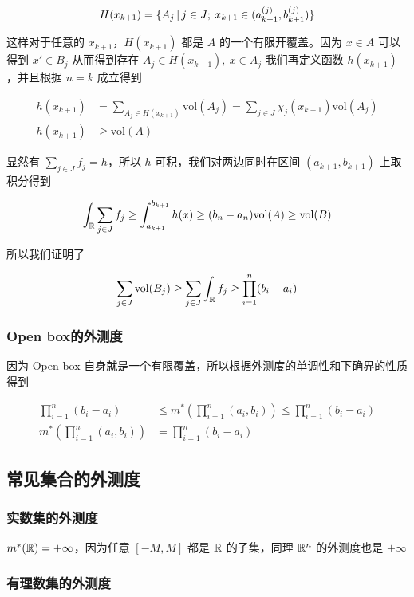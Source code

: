 \[
H(x_{k+1}) = \{ A_j \,\vert\, j \in J;\: x_{k+1} \in (a_{k+1}^{(j)}, b_{k+1}^{(j)}) \}
\]

这样对于任意的 $x_{k+1}$，$H(x_{k+1})$ 都是 $A$ 的一个有限开覆盖。因为 $x \in A$ 可以得到 $x' \in B_j$ 从而得到存在 $A_j \in H(x_{k+1}), \: x \in A_j$
我们再定义函数 $h(x_{k+1})$，并且根据 $n=k$ 成立得到

\begin{align*}
h(x_{k+1}) &= \sum_{A_j \in H(x_{k+1})} \mathrm{vol}(A_j) = \sum_{j \in J}\chi_{j}(x_{k+1}) \mathrm{vol}(A_j) \\
h(x_{k+1}) & \ge \mathrm{vol}(A) 
\end{align*}

 
显然有 $\sum_{j \in J}f_j = h$，所以 $h$ 可积，我们对两边同时在区间 $(a_{k+1}, b_{k+1})$ 上取积分得到


\[
 \int_{\mathbb{R}}\sum_{j \in J}f_j \ge \int_{a_{k+1}}^{b_{k+1}}h(x) \ge (b_n - a_n)\mathrm{vol}(A) \ge \mathrm{vol}(B)
\]


所以我们证明了

\[
    \sum_{j \in J}\mathrm{vol}(B_j) \ge \sum_{j \in J}\int_{\mathbb{R}}f_j \ge \prod_{i=1}^{n}(b_i - a_i)
\]

\subsubsection{Open box的外测度}

因为 Open box 自身就是一个有限覆盖，所以根据外测度的单调性和下确界的性质得到

\begin{align*}
 \prod_{i=1}^{n}(b_i - a_i) & \le m^*(\prod_{i=1}^{n}(a_i, b_i)) \le \prod_{i=1}^{n}(b_i - a_i) \\
m^*(\prod_{i=1}^{n}(a_i, b_i)) & = \prod_{i=1}^{n}(b_i - a_i)
\end{align*}

\subsection{常见集合的外测度}

\subsubsection{实数集的外测度}

$m^*(\mathbb{R}) = +\infty$，因为任意 $[-M, M]$ 都是 $\mathbb{R}$ 的子集，同理 $\mathbb{R}^n$ 的外测度也是 $+\infty$

\subsubsection{有理数集的外测度}

